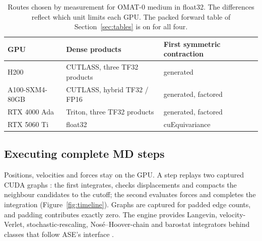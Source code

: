 \documentclass[11pt]{article}
\begin{document}
\begin{table}[t]
\centering
\small
\begin{tabular}{lll}
\toprule
GPU & Dense products & First symmetric contraction \\
\midrule
H200            & CUTLASS, three TF32 products     & generated \\
A100-SXM4-80GB  & CUTLASS, hybrid TF32 / FP16      & generated, factored \\
RTX 4000 Ada    & Triton, three TF32 products      & generated, factored \\
RTX 5060 Ti     & float32                          & cuEquivariance \\
\bottomrule
\end{tabular}
\caption{Routes chosen by measurement for OMAT-0 medium in float32. The differences reflect which unit limits
each GPU. The packed forward table of Section~\ref{sec:tables} is on for all four.}
\label{tab:routes}
\end{table}

\subsection{Executing complete MD steps}
\label{sec:engine}

Positions, velocities and forces stay on the GPU. A step replays two captured CUDA graphs
\cite{cudagraphs}: the first integrates, checks displacements and compacts the neighbour candidates to the
cutoff; the second evaluates forces and completes the integration (Figure~\ref{fig:timeline}). Graphs are
captured for padded edge counts, and padding contributes exactly zero. The engine provides Langevin,
velocity-Verlet, stochastic-rescaling, Nos\'e--Hoover-chain and barostat integrators behind classes that follow
ASE's interface \cite{larsen2017ase}.
\end{document}
